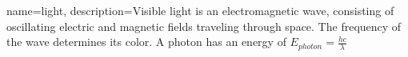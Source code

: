 {
    name=light,
    description={Visible light is an electromagnetic wave, consisting of oscillating electric and magnetic fields traveling through space. The frequency of the wave determines its color. A photon has an energy of $E_{photon}=\frac{hc}{\lambda}$}
}
